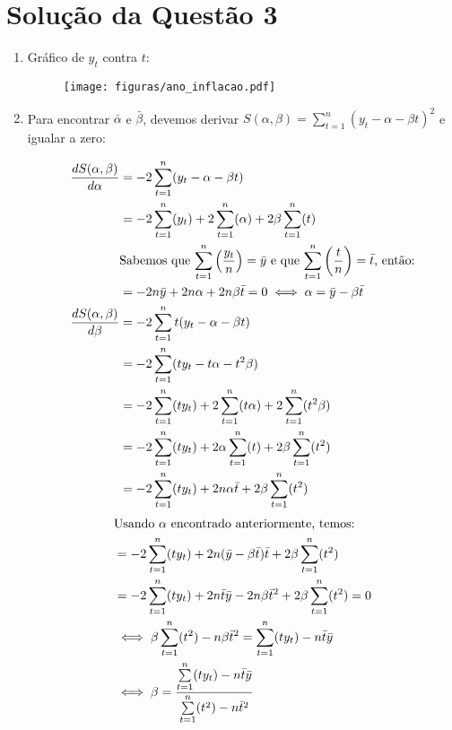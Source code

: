 \documentclass[
	12pt,				%
	openright,			%
	oneside,			%
	a4paper,			%
	english,			%
	brazil,				%
	]{abntex2}
\begin{document}
\section{Solução da Questão 3}
\begin{enumerate}[label=\alph*)]
    \item Gráfico de $y_t$ contra $t$:
    \begin{figure}[H]
        \centering
        \texttt{[image: figuras/ano\_inflacao.pdf]}
    \end{figure}
    
    \item Para encontrar $\bar{\alpha}$ e $\bar{\beta}$, devemos derivar $S(\alpha, \beta) = \sum \limits_{t = 1}^{n} (y_t - \alpha - \beta t)^2$ e igualar a zero:

    \begin{align*}
        \frac{dS(\alpha, \beta)}{d\alpha} &= -2 \sum \limits_{t = 1}^{n} (y_t - \alpha - \beta t)\\
        &= -2\sum \limits_{t = 1}^{n}(y_t) + 2\sum \limits_{t = 1}^{n}(\alpha) + 2\beta\sum \limits_{t = 1}^{n}(t)\\
        &\text{Sabemos que $\sum \limits_{t = 1}^{n}\left(\frac{y_t}{n}\right) = \Bar{y}$ e que $\sum \limits_{t = 1}^{n}\left(\frac{t}{n}\right) = \Bar{t}$, então:}\\
        &= -2n\Bar{y} + 2n\alpha + 2n\beta\Bar{t} = 0 \iff \alpha = \Bar{y} - \beta\Bar{t}\\
        \frac{dS(\alpha, \beta)}{d\beta} &= -2 \sum \limits_{t = 1}^{n} t(y_t - \alpha - \beta t)\\
        &= -2\sum \limits_{t = 1}^{n}(ty_t - t\alpha - t^2\beta)\\
        &= -2\sum \limits_{t = 1}^{n}(ty_t) + 2\sum \limits_{t = 1}^{n}(t\alpha) + 2\sum \limits_{t = 1}^{n}(t^2\beta)\\
        &= -2\sum \limits_{t = 1}^{n}(ty_t) + 2\alpha\sum \limits_{t = 1}^{n}(t) + 2\beta\sum \limits_{t = 1}^{n}(t^2)\\
        &= -2\sum \limits_{t = 1}^{n}(ty_t) + 2n\alpha\Bar{t} + 2\beta\sum \limits_{t = 1}^{n}(t^2)
    \end{align*}
    \begin{align*}
        &\text{Usando $\alpha$ encontrado anteriormente, temos:}\\
        &= -2\sum \limits_{t = 1}^{n}(ty_t) + 2n(\Bar{y} - \beta\Bar{t})\Bar{t} + 2\beta\sum \limits_{t = 1}^{n}(t^2)\\
        &= -2\sum \limits_{t = 1}^{n}(ty_t) + 2n\Bar{t}\Bar{y} - 2n\beta\Bar{t}^2 + 2\beta\sum \limits_{t = 1}^{n}(t^2) = 0\\
        &\iff \beta\sum \limits_{t = 1}^{n}(t^2) - n\beta\Bar{t}^2 = \sum \limits_{t = 1}^{n}(ty_t) - n\Bar{t}\Bar{y}\\
        &\iff \beta = \frac{\sum \limits_{t = 1}^{n}(ty_t) - n\Bar{t}\Bar{y}}{\sum \limits_{t = 1}^{n}(t^2) - n\Bar{t}^2}
    \end{align*}
    

\end{enumerate}
\end{document}
